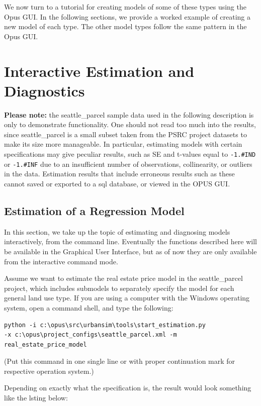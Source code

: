 We now turn to a tutorial for creating models of some of
these types using the Opus GUI.  In the following sections,
we provide a worked example of creating a new model of each
type.  The other model types follow the same pattern in the
Opus GUI.


\section{Interactive Estimation and Diagnostics}
\label{sec:components-model-estimation}
{\bf Please note:} the seattle\_parcel sample data used in the following
description is only to demonstrate functionality.  One should not read too
much into the results, since seattle\_parcel is a small subset taken from
the PSRC project datasets to make its size more manageable.  In particular,
estimating models with certain specifications may give peculiar results,
such as SE and t-values equal to \verb|-1.#IND| or \verb|-1.#INF| due to
an insufficient number of observations, collinearity, or outliers in the
data.  Estimation results that include erroneous results such as these
cannot saved or exported to a sql database, or viewed in the OPUS GUI\@.

\subsection{Estimation of a Regression Model}

In this section, we take up the topic of estimating and diagnosing models
interactively, from the command line.  Eventually the functions described
here will be available in the Graphical User Interface, but as of now they
are only available from the interactive command mode.

Assume we want to estimate the real estate price model in the
seattle\_parcel project, which includes submodels to separately specify the
model for each general land use type.  If you are using a computer with the
Windows operating system, open a command shell, and type the following:

\begin{verbatim}
python -i c:\opus\src\urbansim\tools\start_estimation.py 
-x c:\opus\project_configs\seattle_parcel.xml -m real_estate_price_model
\end{verbatim}
(Put this command in one single line or with proper continuation
mark for respective operation system.)

Depending on exactly what the specification is, the result
would look something like the lsting below:
\\

